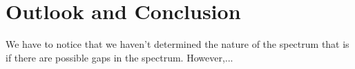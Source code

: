 \chapter{Outlook and Conclusion}	
	
	
We have to notice that we haven't determined the nature of the spectrum that is if there are possible gaps in the spectrum. However,... %
~\\ ~\\

